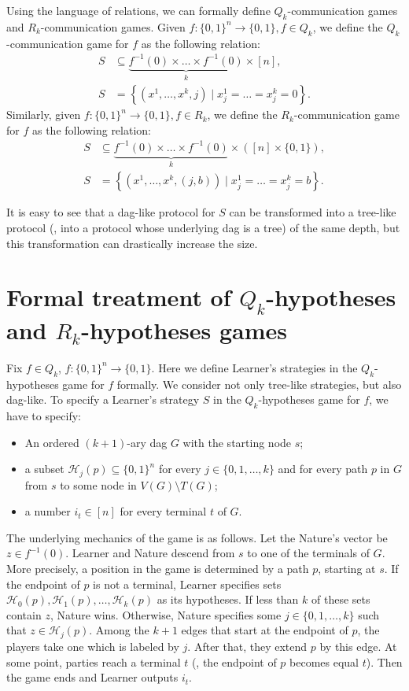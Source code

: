 \documentclass{toc}
\begin{document}
Using the language of relations, we can formally define $Q_k$-communication games and $R_k$-communication games.  %
Given  %
$f\colon\{0, 1\}^n\to\{0,1\}, f\in Q_k$, we define the $Q_k$-communication game for $f$ as the following relation:
\begin{align*}
S &\subseteq \underbrace{f^{-1}(0) \times \ldots \times f^{-1}(0)}_k \times [n], \\
 S &= \left\{(x^1, \ldots, x^k, j) \mid x^1_j  = \ldots = x^k_j = 0\right\}.
\end{align*}
Similarly, given $f\colon\{0, 1\}^n\to\{0,1\}, f\in R_k$, we define the $R_k$-communication game for $f$ as the following relation:
\begin{align*}
S &\subseteq \underbrace{f^{-1}(0) \times \ldots \times f^{-1}(0)}_k \times ([n]\times\{0,1\}), \\
 S &= \left\{(x^1, \ldots, x^k, (j, b)) \mid x^1_j  = \ldots = x^k_j = b\right\}.
\end{align*}

It is easy to see that a dag-like protocol for $S$ can be transformed into a tree-like protocol (\ie, into a protocol whose underlying dag is a tree) of the same depth, but this transformation can drastically increase the size.


\section{Formal treatment of $Q_k$-hypotheses and $R_k$-hypotheses games} 
\label{sec:hypotheses_games}

Fix $f\in Q_k$, $f\colon\{0, 1\}^n\to\{0,1\}$. Here we define Learner's strategies in the $Q_k$-hypotheses game for $f$ formally. We consider not only tree-like strategies, but also dag-like. To specify a Learner's strategy $S$ in the $Q_k$-hypotheses game for $f$, we have to specify:
\begin{itemize}
\item An ordered $(k+1)$-ary dag $G$ with the starting node $s$;
\item a subset $\mathcal{H}_j(p)\subseteq\{0,1\}^n$ for every $j\in\{0, 1, \ldots, k\}$ and for every path $p$ in $G$ from $s$ to some node in $V(G)\setminus T(G)$;
\item a number $i_t\in [n]$ for every terminal $t$ of $G$.
\end{itemize}
The underlying mechanics of the game is as follows. Let the Nature's vector be $z\in f^{-1}(0)$. Learner and Nature descend from $s$ to one of the terminals of $G$. More precisely, a position in the game is determined by a path $p$, starting at $s$. If the endpoint of $p$ is not a terminal, Learner specifies sets $\mathcal{H}_0(p), \mathcal{H}_1(p), \ldots, \mathcal{H}_k(p)$ as its hypotheses.
%
If less than $k$ of these sets contain $z$, Nature wins. Otherwise, Nature specifies some $j\in\{0, 1, \ldots, k\}$ such that $z\in\mathcal{H}_j(p)$. Among the $k+1$ edges that start at the endpoint of $p$, the players take one which is labeled by $j$. After that, they extend $p$ by this edge. At some point, parties reach a terminal $t$ (\ie, the endpoint of $p$ becomes equal $t$). Then the game ends and Learner outputs $i_t$.
\end{document}
